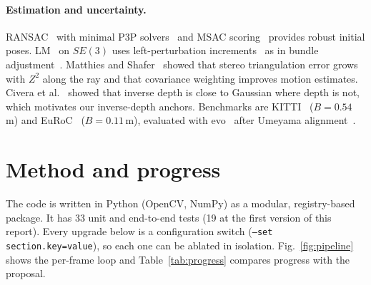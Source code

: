 \documentclass[11pt,a4paper]{article}
\begin{document}
\paragraph{Estimation and uncertainty.} RANSAC~\cite{ransac} with minimal P3P solvers~\cite{p3p,ap3p} and MSAC scoring~\cite{msac} provides robust initial poses. LM~\cite{levenberg,marquardt} on $SE(3)$ uses left-perturbation increments~\cite{barfoot,sola} as in bundle adjustment~\cite{triggs}. Matthies and Shafer~\cite{matthies} showed that stereo triangulation error grows with $Z^2$ along the ray and that covariance weighting improves motion estimates. Civera et al.~\cite{inverse_depth} showed that inverse depth is close to Gaussian where depth is not, which motivates our inverse-depth anchors. Benchmarks are KITTI~\cite{kitti} ($B = 0.54$\,m) and EuRoC~\cite{euroc} ($B = 0.11$\,m), evaluated with evo~\cite{evo} after Umeyama alignment~\cite{umeyama}.

\section{Method and progress}\label{sec:method}
The code is written in Python (OpenCV, NumPy) as a modular, registry-based package. It has 33 unit and end-to-end tests (19 at the first version of this report). Every upgrade below is a configuration switch (\texttt{--set section.key=value}), so each one can be ablated in isolation. Fig.~\ref{fig:pipeline} shows the per-frame loop and Table~\ref{tab:progress} compares progress with the proposal.
\end{document}
